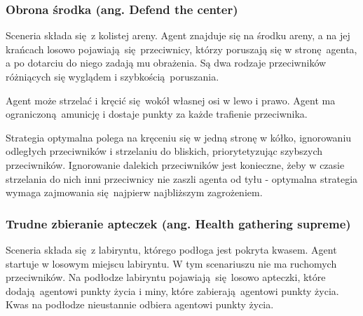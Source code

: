 \subsubsection{Obrona środka (ang. Defend the center)}\label{scenario_dtc}
Sceneria składa się z kolistej areny. Agent znajduje się na środku areny, a na jej krańcach losowo pojawiają się przeciwnicy, którzy poruszają się w stronę agenta, a po dotarciu do niego zadają mu obrażenia. Są dwa rodzaje przeciwników różniących się wyglądem i szybkością poruszania.

Agent może strzelać i kręcić się wokół własnej osi w lewo i prawo. Agent ma ograniczoną amunicję i dostaje punkty za każde trafienie przeciwnika.

Strategia optymalna polega na kręceniu się w jedną stronę w kółko, ignorowaniu odległych przeciwników i strzelaniu do bliskich, priorytetyzując szybszych przeciwników. Ignorowanie dalekich przeciwników jest konieczne, żeby w czasie strzelania do nich inni przeciwnicy nie zaszli agenta od tyłu - optymalna strategia wymaga zajmowania się najpierw najbliższym zagrożeniem.

\begin{figure}[H]
	\begin{floatrow}
	\end{floatrow}
\end{figure}


\subsubsection{Trudne zbieranie apteczek (ang. Health gathering supreme) }\label{scenario_hgs}
Sceneria składa się z labiryntu, którego podłoga jest pokryta kwasem. Agent startuje w losowym miejscu labiryntu. W tym scenariuszu nie ma ruchomych przeciwników. Na podłodze labiryntu pojawiają się losowo apteczki, które dodają agentowi punkty życia i miny, które zabierają agentowi punkty życia. Kwas na podłodze nieustannie odbiera agentowi punkty życia. 

